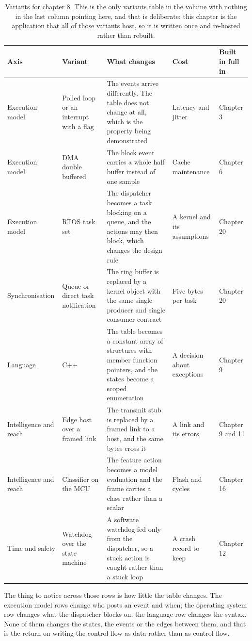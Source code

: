 \begin{table}[H]\centering\small
\begin{tabular}{p{24mm}p{26mm}p{44mm}p{22mm}p{20mm}}
\toprule
Axis & Variant & What changes & Cost & Built in full in \\
\midrule
Execution model & Polled loop or an interrupt with a flag & The events arrive differently. The table does not change at all, which is the property being demonstrated & Latency and jitter & Chapter 3 \\
Execution model & DMA double buffered & The block event carries a whole half buffer instead of one sample & Cache maintenance & Chapter 6 \\
Execution model & RTOS task set & The dispatcher becomes a task blocking on a queue, and the actions may then block, which changes the design rule & A kernel and its assumptions & Chapter 20 \\
Synchronisation & Queue or direct task notification & The ring buffer is replaced by a kernel object with the same single producer and single consumer contract & Five bytes per task & Chapter 20 \\
Language & C++ & The table becomes a constant array of structures with member function pointers, and the states become a scoped enumeration & A decision about exceptions & Chapter 9 \\
Intelligence and reach & Edge host over a framed link & The transmit stub is replaced by a framed link to a host, and the same bytes cross it & A link and its errors & Chapter 9 and 11 \\
Intelligence and reach & Classifier on the MCU & The feature action becomes a model evaluation and the frame carries a class rather than a scalar & Flash and cycles & Chapter 16 \\
Time and safety & Watchdog over the state machine & A software watchdog fed only from the dispatcher, so a stuck action is caught rather than a stuck loop & A crash record to keep & Chapter 12 \\
\bottomrule
\end{tabular}
\caption{Variants for chapter 8. This is the only variants table in the volume with nothing in the last column pointing here, and that is deliberate: this chapter is the application that all of those variants host, so it is written once and re-hosted rather than rebuilt.}
\end{table}

The thing to notice across those rows is how little the table changes. The
execution model rows change who posts an event and when; the operating system
row changes what the dispatcher blocks on; the language row changes the
syntax. None of them changes the states, the events or the edges between them,
and that is the return on writing the control flow as data rather than as
control flow.

